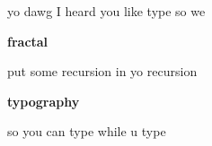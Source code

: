 \documentclass[varwidth,border=0.1in]{standalone}
\begin{document}
\Huge
\begin{center}
\textcolor{snow_cherry}{\footnotesize yo dawg I heard you like type so we}

\textbf{fractal}

\textcolor{snow_cherry}{\footnotesize put some recursion in yo recursion}

\textbf{typography}

\textcolor{snow_cherry}{\footnotesize so you can type while u type}
\end{center}
\end{document}
